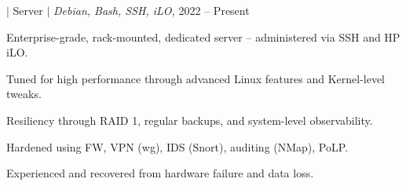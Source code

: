 \begin{project}{\textbf{\laniakea} $|$ Server $|$ \textit{Debian,
  Bash, SSH, iLO, }}{2022 -- Present}
\item Enterprise-grade, rack-mounted, dedicated server --
  administered via SSH and HP iLO.
\item Tuned for high performance through advanced Linux features
  and Kernel-level tweaks.
\item Resiliency through RAID 1, regular backups, and system-level
  observability.
\item Hardened using FW, VPN (wg), IDS (Snort), auditing (NMap), PoLP.
\item Experienced and recovered from hardware failure and data loss.
\end{project}
